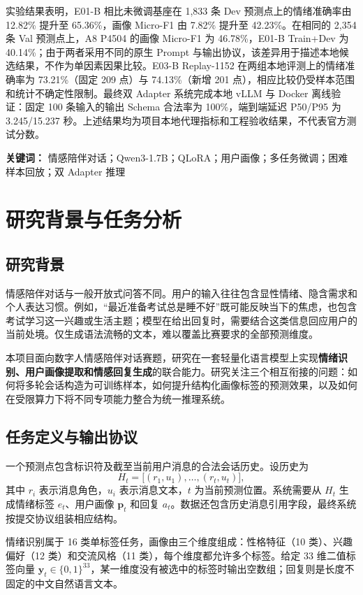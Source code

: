 \documentclass[UTF8,a4paper,zihao=-4,oneside]{ctexrep}
\newcommand{\textterm}[1]{\textbf{#1}}
\begin{document}
实验结果表明，E01-B 相比未微调基座在 1,833 条 Dev 预测点上的情绪准确率由 12.82\% 提升至 65.36\%，画像 Micro-F1 由 7.82\% 提升至 42.23\%。在相同的 2,354 条 Val 预测点上，A8 P4504 的画像 Micro-F1 为 46.78\%，E01-B Train+Dev 为 40.14\%；由于两者采用不同的原生 Prompt 与输出协议，该差异用于描述本地候选结果，不作为单因素因果比较。E03-B Replay-1152 在两组本地评测上的情绪准确率为 73.21\%（固定 209 点）与 74.13\%（新增 201 点），相应比较仍受样本范围和统计不确定性限制。最终双 Adapter 系统完成本地 vLLM 与 Docker 离线验证：固定 100 条输入的输出 Schema 合法率为 100\%，端到端延迟 P50/P95 为 3.245/15.237 秒。上述结果均为项目本地代理指标和工程验收结果，不代表官方测试分数。

\noindent\textbf{关键词：} 情感陪伴对话；Qwen3-1.7B；QLoRA；用户画像；多任务微调；困难样本回放；双 Adapter 推理
\clearpage
\tableofcontents
\clearpage
{}

\chapter{研究背景与任务分析}
\section{研究背景}
情感陪伴对话与一般开放式问答不同。用户的输入往往包含显性情绪、隐含需求和个人表达习惯。例如，“最近准备考试总是睡不好”既可能反映当下的焦虑，也包含考试学习这一兴趣或生活主题；模型在给出回复时，需要结合这类信息回应用户的当前处境。仅生成语法流畅的文本，难以覆盖比赛要求的全部预测维度。

本项目面向数字人情感陪伴对话赛题，研究在一套轻量化语言模型上实现\textterm{情绪识别、用户画像提取和情感回复生成}的联合能力。研究关注三个相互衔接的问题：如何将多轮会话构造为可训练样本，如何提升结构化画像标签的预测效果，以及如何在受限算力下将不同专项能力整合为统一推理系统。

\section{任务定义与输出协议}
一个预测点包含标识符及截至当前用户消息的合法会话历史。设历史为
\begin{equation}
 H_t=\bigl[(r_1,u_1),\ldots,(r_t,u_t)\bigr],
\end{equation}
其中 $r_i$ 表示消息角色，$u_i$ 表示消息文本，$t$ 为当前预测位置。系统需要从 $H_t$ 生成情绪标签 $e_t$、用户画像 $\bm p_t$ 和回复 $a_t$。数据还包含历史消息引用字段，最终系统按提交协议组装相应结构。

情绪识别属于 16 类单标签任务，画像由三个维度组成：性格特征（10 类）、兴趣偏好（12 类）和交流风格（11 类），每个维度都允许多个标签。给定 33 维二值标签向量 $\bm y_t\in\{0,1\}^{33}$，某一维度没有被选中的标签时输出空数组；回复则是长度不固定的中文自然语言文本。
\end{document}

